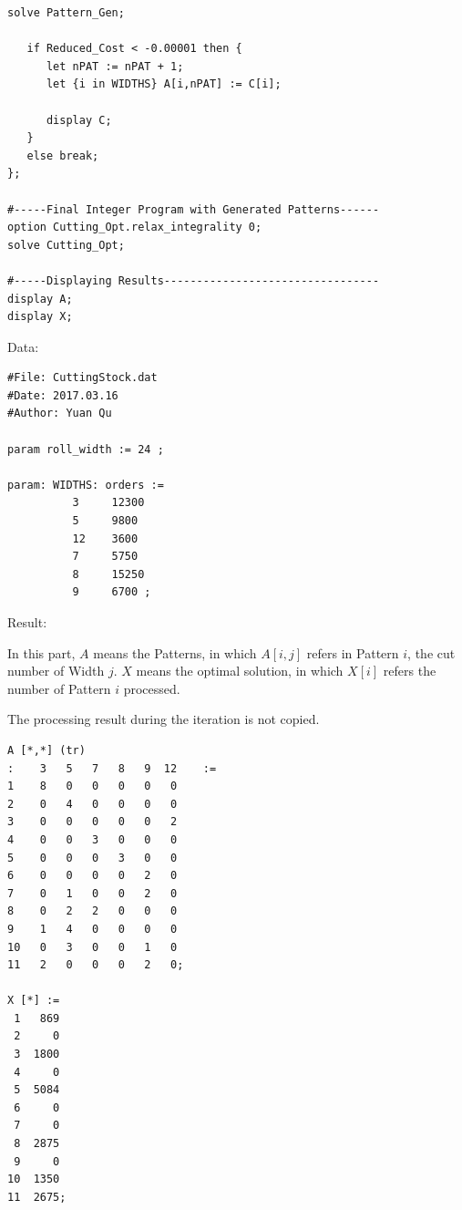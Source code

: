 \documentclass{article}
\begin{document}
{\begin{lstlisting}[language=AMPL]
   solve Pattern_Gen;

   if Reduced_Cost < -0.00001 then {
      let nPAT := nPAT + 1;
      let {i in WIDTHS} A[i,nPAT] := C[i];
      
      display C;
   }
   else break;
};

#-----Final Integer Program with Generated Patterns------
option Cutting_Opt.relax_integrality 0;
solve Cutting_Opt;

#-----Displaying Results---------------------------------
display A; 
display X;
    \end{lstlisting}

    Data:
    \begin{lstlisting}[language=AMPL]
#File: CuttingStock.dat
#Date: 2017.03.16
#Author: Yuan Qu

param roll_width := 24 ;

param: WIDTHS: orders :=
          3     12300
          5     9800
          12    3600
          7     5750
          8     15250
          9     6700 ;

    \end{lstlisting}

    Result:

    In this part, \(\mathit{A}\) means the Patterns, in which \(\mathit{A[i,j]}\) refers in Pattern \(\mathit{i}\), the cut number of Width \(\mathit{j}\). \(\mathit{X}\) means the optimal solution, in which \(\mathit{X[i]}\) refers the number of Pattern \(\mathit{i}\) processed.

    The processing result during the iteration is not copied.
    \begin{lstlisting}
A [*,*] (tr)
:    3   5   7   8   9  12    :=
1    8   0   0   0   0   0
2    0   4   0   0   0   0
3    0   0   0   0   0   2
4    0   0   3   0   0   0
5    0   0   0   3   0   0
6    0   0   0   0   2   0
7    0   1   0   0   2   0
8    0   2   2   0   0   0
9    1   4   0   0   0   0
10   0   3   0   0   1   0
11   2   0   0   0   2   0;

X [*] :=
 1   869
 2     0
 3  1800
 4     0
 5  5084
 6     0
 7     0
 8  2875
 9     0
10  1350
11  2675;
    \end{lstlisting}
}
\end{document}
